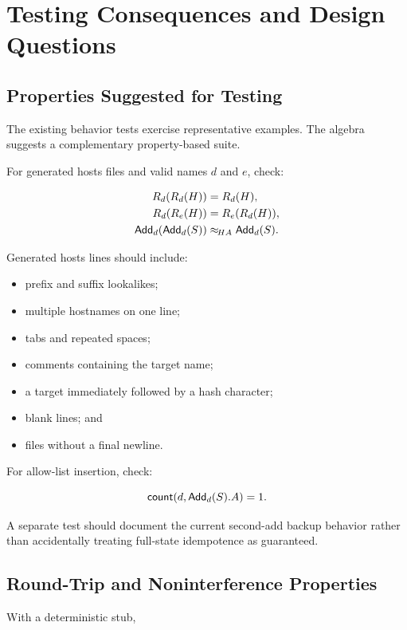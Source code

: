 \section{Testing Consequences and Design Questions}

\subsection{Properties Suggested for Testing}

The existing behavior tests exercise representative examples.  The algebra
suggests a complementary property-based suite.

For generated hosts files and valid names $d$ and $e$, check:

\begin{align*}
R_{d}(R_{d}(H)) &= R_{d}(H),\\
R_{d}(R_{e}(H)) &= R_{e}(R_{d}(H)),\\
\mathsf{Add}_{d}(\mathsf{Add}_{d}(S)) &\mathrel{\approx_{\!HA}} \mathsf{Add}_{d}(S).
\end{align*}

Generated hosts lines should include:

\begin{itemize}
  \item prefix and suffix lookalikes;
  \item multiple hostnames on one line;
  \item tabs and repeated spaces;
  \item comments containing the target name;
  \item a target immediately followed by a hash character;
  \item blank lines; and
  \item files without a final newline.
\end{itemize}

For allow-list insertion, check:

\[
  \mathsf{count}(d,\mathsf{Add}_{d}(S).A)=1.
\]

A separate test should document the current second-add backup behavior rather
than accidentally treating full-state idempotence as guaranteed.

\subsection{Round-Trip and Noninterference Properties}

With a deterministic  stub,


